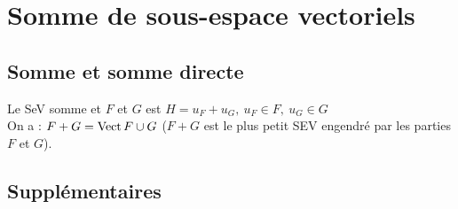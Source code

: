 \section{Somme de sous-espace vectoriels}\label{sec:somme-de-sous-espace-vectoriels}

    \subsection{Somme et somme directe}\label{subsec:somme-et-somme-directe}

        Le SeV somme et $F$ et $G$ est $H = {u_F + u_G,\ u_F \in F,\ u_G \in G}$\\

        On a : $F + G = \operatorname{Vect}{F \cup G}$ ($F + G$ est le plus petit SEV engendré par les parties $F$ et $G$).

    \subsection{Supplémentaires}\label{subsec:supplementaires}

